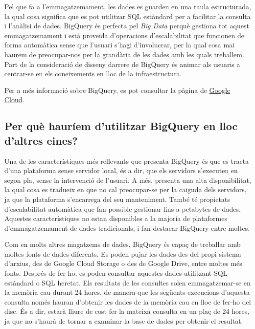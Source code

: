 \documentclass[12pt,longbibliography]{article}
\theoremstyle{definition}
\theoremstyle{remark}
\begin{document}
Pel que fa a l’emmagatzemament, les dades es guarden en una taula estructurada, la qual cosa significa que es pot utilitzar SQL estàndard per a facilitar la consulta i l’anàlisi de dades. BigQuery és perfecta pel \textit{Big Data} perquè gestiona tot aquest emmagatzemament i està proveïda d’operacions d’escalabilitat que funcionen de forma automàtica sense que l’usuari s’hagi d’involucrar,  per la qual cosa mai haurem de preocupar-nos per la grandària de les dades amb les quals treballem. Part de la consideració de disseny darrere de BigQuery és animar als usuaris a centrar-se en els coneixements en lloc de la infraestructura. 

\noindent

Per a més informació sobre BigQuery, es pot consultar la pàgina de \href{https://cloud.google.com/bigquery/docs/introduction}{Google Cloud}.

\subsection{Per què hauríem d'utilitzar BigQuery en lloc d'altres eines?}

Una de les característiques més rellevants que presenta BigQuery és que es tracta d'una plataforma sense servidor local, és a dir, que els servidors s'executen en segon pla, sense la intervenció de l'usuari. A més, presenta una alta disponibilitat, la qual cosa es tradueix en que no cal preocupar-se per la caiguda dels servidors, ja que la plataforma s'encarrega del seu manteniment. També té propietats d'escalabilitat automàtica que fan possible gestionar fins a petabytes de dades. Aquestes característiques no estan disponibles a la majoria de plataformes d'emmagatzemament de dades tradicionals, i fan destacar BigQuery entre moltes.



Com en molts altres magatzems de dades, BigQuery és capaç de treballar amb moltes fonts de dades diferents. Es poden pujar les dades des del propi sistema d'arxius, des de Google Cloud Storage o des de Google Drive, entre moltes més fonts. Després de fer-ho, es poden consultar aquestes dades utilitzant SQL estàndard o SQL heretat. Els resultats de les consultes solen emmagatzemar-se en la memòria cau durant 24 hores, de manera que les següents execucions d'aquesta consulta només hauran d'obtenir les dades de la memòria cau en lloc de fer-ho del disc. És a dir, estarà lliure de cost fer la mateixa consulta en un plaç de 24 hores, ja que no s'haurà de tornar a examinar la base de dades per obtenir el resultat.
\end{document}
